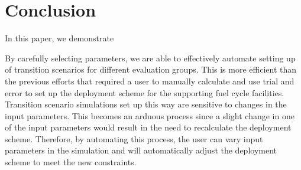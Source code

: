 \section{Conclusion}
In this paper, we demonstrate 

By carefully selecting \deploy parameters, we are able to 
effectively automate setting up of transition scenarios for 
different evaluation groups. 
This is more efficient than the previous efforts that
required a user to manually calculate and use trial and error 
to set up the deployment scheme for the supporting fuel cycle 
facilities. 
Transition scenario simulations set up this way are sensitive 
to changes in the input parameters. 
This becomes an arduous process since a slight change in one 
of the input parameters would result in the need to recalculate 
the deployment scheme.  
Therefore, by automating this process, the user can vary input parameters 
in the simulation and \deploy will automatically adjust the
deployment scheme to meet the new constraints. 
